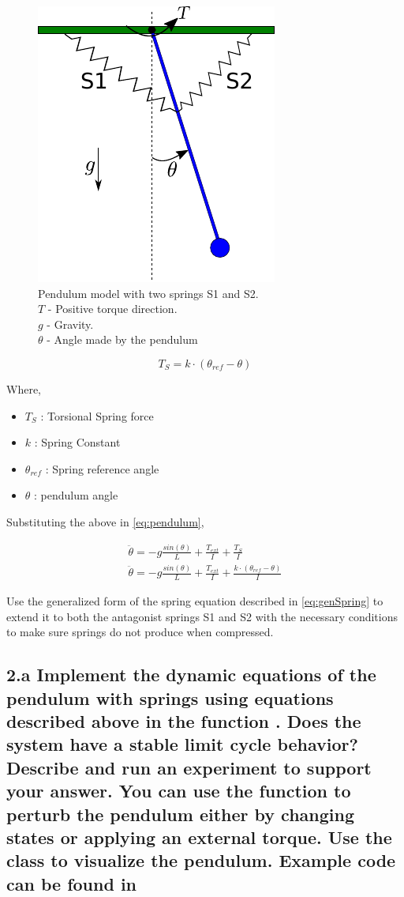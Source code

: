 \documentclass{cmc}
\begin{document}
\begin{figure}[H]
  \centering
  \includegraphics[width=.3\textwidth]{figures/pendulum_spring}
  \caption[pendulum with spring]{Pendulum model with two springs S1
    and S2.\\
    $T$ - Positive torque direction.\\
    $g$ - Gravity.\\
    $\theta$ - Angle made by the pendulum}
  \label{fig:pendulum_spring}
\end{figure}


\begin{equation}
  \label{eqn:spring}
  T_{S} = k \cdot (\theta_{ref} - \theta)
\end{equation}

Where,
\begin{itemize}
\item $T_{S}$ : Torsional Spring force
\item $k$ : Spring Constant
\item $\theta_{ref}$ : Spring reference angle
\item $\theta$ : pendulum angle
\end{itemize}

Substituting the above in \ref{eq:pendulum},

\begin{eqnarray}
  \label{eq:spring}
  \ddot{\theta} = -g\frac{sin(\theta)}{L} + \frac{T_{ext}}{I} + \frac{T_{S}}{I} \\
  \ddot{\theta} = -g\frac{sin(\theta)}{L} + \frac{T_{ext}}{I} + \frac{k \cdot (\theta_{ref} - \theta)}{I} \label{eq:genSpring}
\end{eqnarray}

Use the generalized form of the spring equation described in
\ref{eq:genSpring} to extend it to both the antagonist springs S1 and
S2 with the necessary conditions to make sure springs do not produce
when compressed.



\subsection*{2.a Implement the dynamic equations of the pendulum with
  springs using equations described above in the function
  .  Does the system
  have a stable limit cycle behavior?  Describe and run an experiment
  to support your answer. You can use the function
   to perturb the
  pendulum either by changing states or applying an external torque.
  Use the class  to
  visualize the pendulum. Example code can be found in
  }
\label{subsec:2.a}
\end{document}
